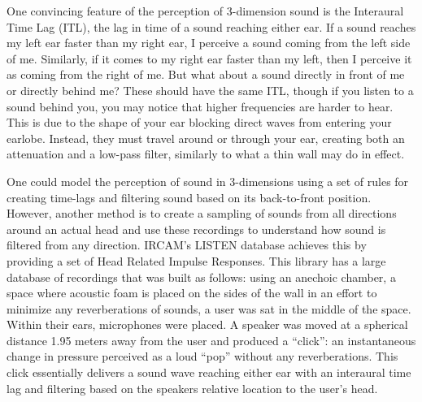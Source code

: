 \documentclass[a4paper,10pt,final]{ThesisStyle}
\begin{document}
One convincing feature of the perception of 3-dimension sound is the Interaural Time Lag (ITL), the lag in time of a sound reaching either ear.  If a sound reaches my left ear faster than my right ear, I perceive a sound coming from the left side of me.  Similarly, if it comes to my right ear faster than my left, then I perceive it as coming from the right of me.  But what about a sound directly in front of me or directly behind me?  These should have the same ITL, though if you listen to a sound behind you, you may notice that higher frequencies are harder to hear.  This is due to the shape of your ear blocking direct waves from entering your earlobe.  Instead, they must travel around or through your ear, creating both an attenuation and a low-pass filter, similarly to what a thin wall may do in effect.  

One could model the perception of sound in 3-dimensions using a set of rules for creating time-lags and filtering sound based on its back-to-front position.  However, another method is to create a sampling of sounds from all directions around an actual head and use these recordings to understand how sound is filtered from any direction.  IRCAM's LISTEN database achieves this by providing a set of Head Related Impulse Responses.  This library has a large database of recordings that was built as follows: using an anechoic chamber, a space where acoustic foam is placed on the sides of the wall in an effort to minimize any reverberations of sounds, a user was sat in the middle of the space.  Within their ears, microphones were placed.  A speaker was moved at a spherical distance 1.95 meters away from the user and produced a ``click'': an instantaneous change in pressure perceived as a loud ``pop'' without any reverberations.  This click essentially delivers a sound wave reaching either ear with an interaural time lag and filtering based on the speakers relative location to the user's head.  
\end{document}
